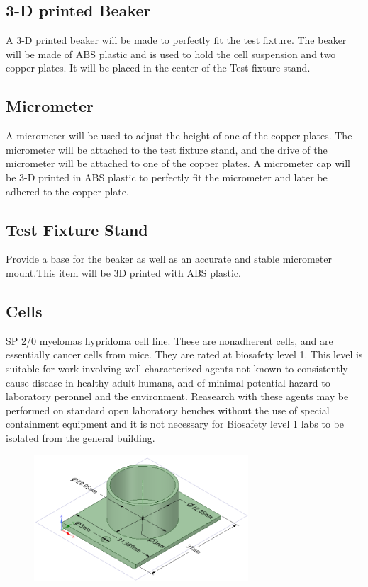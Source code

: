 \documentclass[journal]{IEEEtran}
\begin{document}
\subsection{3-D printed Beaker}
A 3-D printed beaker will be made to perfectly fit the test fixture. The beaker will be made of ABS plastic and is used to hold the cell suspension and two copper plates. It will be placed in the center of the Test fixture stand.

\subsection{Micrometer}
A micrometer will be used to adjust the height of one of the copper plates. The micrometer will be attached to the test fixture stand, and the drive of the micrometer will be attached to one of the copper plates. A micrometer cap will be 3-D printed in ABS plastic to perfectly fit the micrometer and later be adhered to the copper plate.

\subsection{Test Fixture Stand}
Provide a base for the beaker as well as an accurate and stable micrometer mount.This item will be 3D printed with ABS plastic.

\subsection{Cells}
SP 2/0 myelomas hypridoma cell line. These are nonadherent cells, and are essentially cancer cells from mice.\cite{mouse-myeloma-hybridoma-strain} They are rated at biosafety level 1. This level is suitable for work involving well-characterized agents not known to consistently cause disease in healthy adult humans, and of minimal potential hazard to laboratory peronnel and the environment. Reasearch with these agents may be performed on standard open laboratory benches without the use of special containment equipment and it is not necessary for Biosafety level 1 labs to be isolated from the general building.\cite{biosafety-levels}

\begin{figure}[h]
\label{test-fixture}
\includegraphics[width=8cm]{Beaker.png}
\end{figure}
\end{document}
